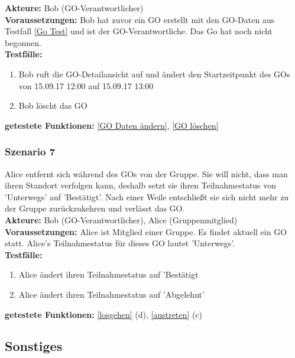 \documentclass[parskip=full]{scrartcl}
\def\threedigits#1{%
  \ifnum#1<100 0\fi
  \ifnum#1<10 0\fi
  \number#1}
\begin{document}
\textbf{Akteure:} Bob (GO-Verantwortlicher)\\

\textbf{Voraussetzungen: }Bob hat zuvor ein GO erstellt mit den GO-Daten aus Testfall \ref{Go Test} und ist der GO-Verantwortliche. Das Go hat noch nicht begonnen.\\

\textbf{Testfälle:}
\begin{enumerate}[label={\textbf{/T\protect\threedigits{\theenumi}0/}}, leftmargin=*, resume]
	\item Bob ruft die GO-Detailansicht auf und ändert den Startzeitpunkt des GOs von 15.09.17 12:00 auf 15.09.17 13:00
	\item Bob löscht das GO
\end{enumerate}

\textbf{getestete Funktionen: }\ref{GO Daten ändern}, \ref{GO löschen}

\subsubsection*{Szenario 7}Alice entfernt sich während des GOs von der Gruppe. Sie will nicht, dass man ihren Standort verfolgen kann, deshalb setzt sie ihren Teilnahmestatus von 'Unterwegs' auf 'Bestätigt'. Nach einer Weile entschließt sie sich nicht mehr zu der Gruppe zurückzukehren und verlässt das GO.\\

\textbf{Akteure:} Bob (GO-Verantwortlicher), Alice (Gruppenmitglied)\\

\textbf{Voraussetzungen: }Alice ist Mitglied einer Gruppe. Es findet aktuell ein GO statt. Alice's Teilnahmestatus für dieses GO lautet 'Unterwegs'.\\

\textbf{Testfälle:}
\begin{enumerate}[label={\textbf{/T\protect\threedigits{\theenumi}0/}}, leftmargin=*, resume]
	\item Alice ändert ihren Teilnahmestatus auf 'Bestätigt
	\item Alice ändert ihren Teilnahmestatus auf 'Abgelehnt'
\end{enumerate}

\textbf{getestete Funktionen: }\ref{losgehen} (d), \ref{austreten} (c)

\subsection{Sonstiges}
\end{document}
